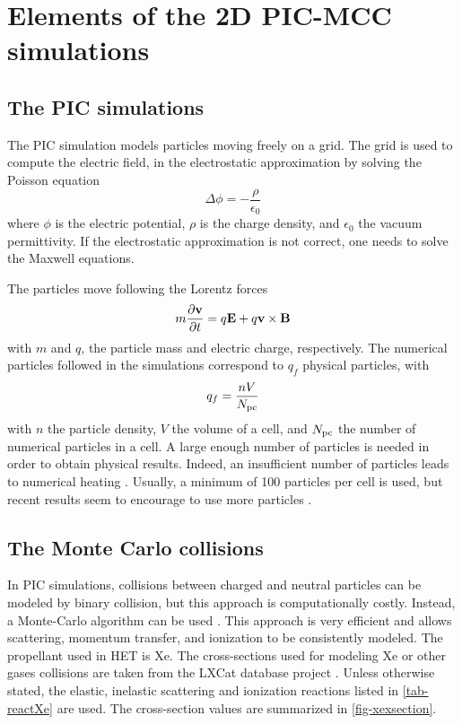 
\section{Elements of the 2D PIC-MCC simulations}
  \label{sec-elements}
  \subsection{The PIC simulations}
    \label{subsec-intro}
    The \ac{PIC} simulation models particles moving freely on a grid.
    The grid is used to compute the electric field, in the electrostatic approximation by solving the Poisson equation
    \begin{equation}
      \label{eq-poisson}
      \Delta \phi = - \frac{\rho}{\epsilon_0}
    \end{equation}
    where $\phi$ is the electric potential, $\rho$ is the charge density, and $\epsilon_0$ the vacuum permittivity.
    If the electrostatic approximation is not correct, one needs to solve the Maxwell equations.

    The particles move following the Lorentz forces
    \begin{equation}
      \label{eq-Lor}
      m \frac{\partial {\bf v}}{\partial t} = q {\mathbf E} + q {\bf v} \times {\bf B}
    \end{equation}
    with $m$ and $q$, the particle mass and electric charge, respectively.
    The numerical particles followed in the simulations correspond to $q_f$ physical particles, with
    \begin{equation}
      q_f = \frac{n V}{N_{\rm pc}}
    \end{equation}
    with $n$ the particle density, $V$ the volume of a cell, and $N_{\rm pc}$ the number of numerical particles in a cell.
    A large enough number of particles is needed in order to obtain physical results.
    Indeed, an insufficient number of particles leads to numerical heating \cite{ueda1994}.
    Usually, a minimum of 100 particles per cell is used, but recent results seem to encourage to use more particles \cite{janhunen2018}.

  \subsection{The Monte Carlo collisions}

    In \ac{PIC} simulations, collisions between charged and neutral particles can be modeled by binary collision, but this approach is computationally costly.
    Instead, a Monte-Carlo algorithm can be used \cite{vahedi1995}.
    This approach is very efficient and allows scattering, momentum transfer, and ionization to be consistently modeled.
    The propellant used in \ac{HET} is \ac{Xe}.
    The cross-sections used for modeling \ac{Xe} or other gases collisions are taken from the {\sc LXCat} database project \cite{LXCat_web,pancheshnyi2012}.
    Unless otherwise stated, the elastic, inelastic scattering and ionization reactions listed in \cref{tab-reactXe} are used.
    The cross-section values are summarized in \cref{fig-xexsection}.

